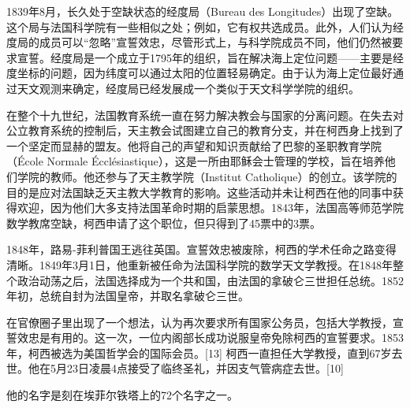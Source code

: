1839年8月，长久处于空缺状态的经度局（Bureau des Longitudes）出现了空缺。这个局与法国科学院有一些相似之处；例如，它有权共选成员。此外，人们认为经度局的成员可以“忽略”宣誓效忠，尽管形式上，与科学院成员不同，他们仍然被要求宣誓。经度局是一个成立于1795年的组织，旨在解决海上定位问题——主要是经度坐标的问题，因为纬度可以通过太阳的位置轻易确定。由于认为海上定位最好通过天文观测来确定，经度局已经发展成一个类似于天文科学学院的组织。

在整个十九世纪，法国教育系统一直在努力解决教会与国家的分离问题。在失去对公立教育系统的控制后，天主教会试图建立自己的教育分支，并在柯西身上找到了一个坚定而显赫的盟友。他将自己的声望和知识贡献给了巴黎的圣职教育学院（École Normale Écclésiastique），这是一所由耶稣会士管理的学校，旨在培养他们学院的教师。他还参与了天主教学院（Institut Catholique）的创立。该学院的目的是应对法国缺乏天主教大学教育的影响。这些活动并未让柯西在他的同事中获得欢迎，因为他们大多支持法国革命时期的启蒙思想。1843年，法国高等师范学院数学教席空缺，柯西申请了这个职位，但只得到了45票中的3票。

1848年，路易-菲利普国王逃往英国。宣誓效忠被废除，柯西的学术任命之路变得清晰。1849年3月1日，他重新被任命为法国科学院的数学天文学教授。在1848年整个政治动荡之后，法国选择成为一个共和国，由法国的拿破仑三世担任总统。1852年初，总统自封为法国皇帝，并取名拿破仑三世。

在官僚圈子里出现了一个想法，认为再次要求所有国家公务员，包括大学教授，宣誓效忠是有用的。这一次，一位内阁部长成功说服皇帝免除柯西的宣誓要求。1853年，柯西被选为美国哲学会的国际会员。[13] 柯西一直担任大学教授，直到67岁去世。他在5月23日凌晨4点接受了临终圣礼，并因支气管病症去世。[10]

他的名字是刻在埃菲尔铁塔上的72个名字之一。

